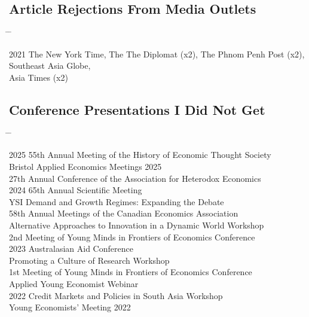 \documentclass[10pt,a4paper]{article}
\newcommand{\tabbedblock}[1]{

	\begin{tabbing}
		\hspace{2cm} \= \hspace{4cm} \= \kill
		#1
	\end{tabbing}
}
\begin{document}
\subsection*{Article Rejections From Media Outlets}

\tabbedblock{
	2021 \> The New York Time, The The Diplomat (x2), The Phnom Penh Post (x2), Southeast Asia Globe, \\
	\> Asia Times (x2) 
	
}
\subsection*{Conference Presentations I Did Not Get}

\tabbedblock{
	
	2025 \> 55th Annual Meeting of the History of Economic Thought Society \\
			\> Bristol Applied Economics Meetings 2025 \\
			 \> 27th Annual Conference of the Association for Heterodox Economics \\
	
	2024 \> 65th Annual Scientific Meeting \\
			\> YSI Demand and Growth Regimes: Expanding the Debate \\
			\> 58th Annual Meetings of the Canadian Economics Association \\
			\> Alternative Approaches to Innovation in a Dynamic World Workshop \\
			\> 2nd Meeting of Young Minds in Frontiers of Economics Conference \\
	
	2023 \> 2023 Australasian Aid Conference \\
			\> Promoting a Culture of Research Workshop \\
			\> 1st Meeting of Young Minds in Frontiers of Economics Conference \\
			\> Applied Young Economist Webinar \\
	2022 \> Credit Markets and Policies in South Asia Workshop \\
			\> Young Economists' Meeting 2022
}
\end{document}
